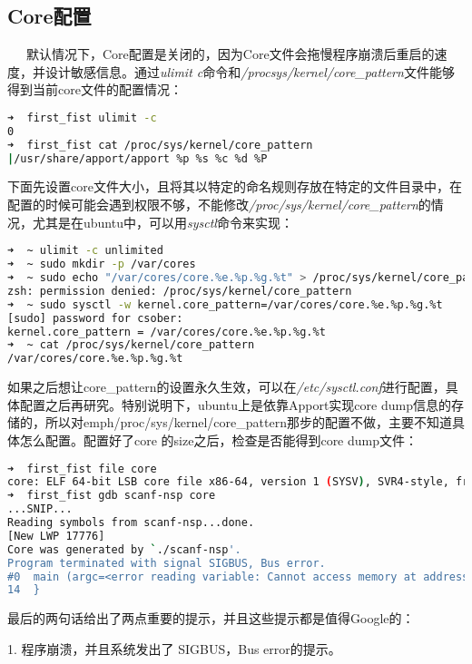 \documentclass[12pt]{article}  %
\begin{document}
\subsection{Core配置}
\ \ \ 默认情况下，Core配置是关闭的，因为Core文件会拖慢程序崩溃后重启的速度，并设计敏感信息。通过\emph{ulimit \-c}命令和\emph{/procsys/kernel/core\_pattern}文件能够得到当前core文件的配置情况：\par
\begin{lstlisting}[language=sh]
➜  first_fist ulimit -c
0
➜  first_fist cat /proc/sys/kernel/core_pattern 
|/usr/share/apport/apport %p %s %c %d %P
\end{lstlisting}\par
下面先设置core文件大小，且将其以特定的命名规则存放在特定的文件目录中，在配置的时候可能会遇到权限不够，不能修改\emph{/proc/sys/kernel/core\_pattern}的情况，尤其是在ubuntu中，可以用\emph{sysctl}命令来实现：
\begin{lstlisting}[language=sh]
➜  ~ ulimit -c unlimited
➜  ~ sudo mkdir -p /var/cores
➜  ~ sudo echo "/var/cores/core.%e.%p.%g.%t" > /proc/sys/kernel/core_pattern
zsh: permission denied: /proc/sys/kernel/core_pattern
➜  ~ sudo sysctl -w kernel.core_pattern=/var/cores/core.%e.%p.%g.%t
[sudo] password for csober: 
kernel.core_pattern = /var/cores/core.%e.%p.%g.%t
➜  ~ cat /proc/sys/kernel/core_pattern 
/var/cores/core.%e.%p.%g.%t

\end{lstlisting}\par
如果之后想让core\_pattern的设置永久生效，可以在\emph{/etc/sysctl.conf}进行配置，具体配置之后再研究。特别说明下，ubuntu上是依靠Apport实现core dump信息的存储的，所以对emph{/proc/sys/kernel/core\_pattern}那步的配置不做，主要不知道具体怎么配置。配置好了core 的size之后，检查是否能得到core dump文件：
\begin{lstlisting}[language=sh]
➜  first_fist file core 
core: ELF 64-bit LSB core file x86-64, version 1 (SYSV), SVR4-style, from './scanf-nsp'
➜  first_fist gdb scanf-nsp core 
...SNIP...
Reading symbols from scanf-nsp...done.
[New LWP 17776]
Core was generated by `./scanf-nsp'.
Program terminated with signal SIGBUS, Bus error.
#0  main (argc=<error reading variable: Cannot access memory at address 0xf7ffffffd99c>, argv=<error reading variable: Cannot access memory at address 0xf7ffffffd990>) at scanf.c:14
14	}
\end{lstlisting}\par
最后的两句话给出了两点重要的提示，并且这些提示都是值得Google的：\par
1. 程序崩溃，并且系统发出了 SIGBUS，Bus error的提示。\par
\end{document}
